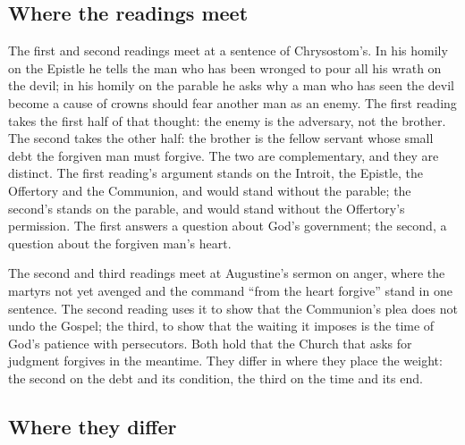 \subsection{Where the readings meet}

The first and second readings meet at a sentence of Chrysostom's. In his homily on
the Epistle he tells the man who has been wronged to pour all his wrath on the
devil; in his homily on the parable he asks why a man who has seen the devil
become a cause of crowns should fear another man as an enemy. The first reading
takes the first half of that thought: the enemy is the adversary, not the
brother. The second takes the other half: the brother is the fellow servant whose
small debt the forgiven man must forgive. The two are complementary, and they are
distinct. The first reading's argument stands on the Introit, the Epistle, the
Offertory and the Communion, and would stand without the parable; the second's
stands on the parable, and would stand without the Offertory's permission. The
first answers a question about God's government; the second, a question about
the forgiven man's heart.

The second and third readings meet at Augustine's sermon on anger, where the
martyrs not yet avenged and the command ``from the heart forgive'' stand in one
sentence. The second reading uses it to show that the Communion's plea does not
undo the Gospel; the third, to show that the waiting it imposes is the time of
God's patience with persecutors. Both hold that the Church that asks for judgment
forgives in the meantime. They differ in where they place the weight: the second
on the debt and its condition, the third on the time and its end.

\subsection{Where they differ}

